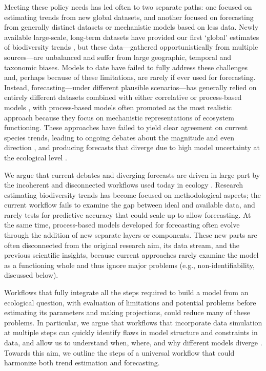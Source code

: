 \documentclass[11pt]{article}
\begin{document}
Meeting these policy needs has led often to two separate paths: one focused on estimating trends from new global datasets, and another focused on forecasting from generally distinct datasets or mechanistic models based on less data. Newly available large-scale, long-term datasets have provided our first `global' estimates of biodiversity trends \citep[e.g.][]{loh2005living,Dornelas2018}, but these data---gathered opportunistically from multiple sources---are unbalanced and suffer from large geographic, temporal and taxonomic biases. Models to date have failed to fully address these challenges and, perhaps because of these limitations, are rarely if ever used for forecasting.
Instead, forecasting---under different plausible scenarios---has generally relied on entirely different datasets combined with either correlative or process-based models \citep{IPBES2019}, with process-based models often promoted as the most realistic approach \citep{Urban2016, Pilowsky2022} because they focus on mechanistic representations of ecosystem functioning. These approaches have failed to yield clear agreement on current species trends, leading to ongoing debates about the magnitude and even direction \citep{Dornelas2014, Leung2020, Buschke2021, Johnson2024}, and producing forecasts that diverge due to high model uncertainty at the ecological level \citep{Cheaib2012, Thuiller2019}.

We argue that current debates and diverging forecasts are driven in large part by the incoherent and disconnected workflows used today in ecology \citep{Loreau2022, Talis2023, Johnson2024}. Research estimating biodiversity trends has become focused on methodological aspects; the current workflow fails to examine the gap between ideal and available data, and rarely tests for predictive accuracy that could scale up to allow forecasting. At the same time, process-based models developed for forecasting often evolve through the addition of new separate layers or components. These new parts are often disconnected from the original research aim, its data stream, and the previous scientific insights, because current approaches rarely examine the model as a functioning whole and thus ignore major problems (e.g., non-identifiability, discussed below).

Workflows that fully integrate all the steps required to build a model from an ecological question, with evaluation of limitations and potential problems before estimating its parameters and making projections, could reduce many of these problems. In particular, we argue that workflows that incorporate data simulation at multiple steps can quickly identify flaws in model structure and constraints in data, and allow us to understand when, where, and why different models diverge \citep{McElreath2018, betanworkflow, Gelman2020, Wolkovich2024}. Towards this aim, we outline the steps of a universal workflow that could harmonize both trend estimation and forecasting.
\end{document}
